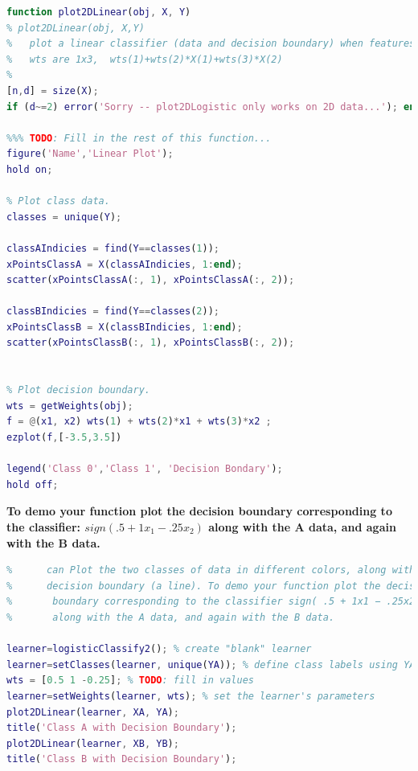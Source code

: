 \documentclass[]{report}   %
\begin{document}
\begin{lstlisting}[language=Matlab, caption=plot2DLinear() Implementation]
function plot2DLinear(obj, X, Y)
% plot2DLinear(obj, X,Y)
%   plot a linear classifier (data and decision boundary) when features X are 2-dim
%   wts are 1x3,  wts(1)+wts(2)*X(1)+wts(3)*X(2)
%
[n,d] = size(X);
if (d~=2) error('Sorry -- plot2DLogistic only works on 2D data...'); end;

%%% TODO: Fill in the rest of this function...
figure('Name','Linear Plot');
hold on;

% Plot class data.
classes = unique(Y);

classAIndicies = find(Y==classes(1));
xPointsClassA = X(classAIndicies, 1:end);
scatter(xPointsClassA(:, 1), xPointsClassA(:, 2));

classBIndicies = find(Y==classes(2));
xPointsClassB = X(classBIndicies, 1:end);
scatter(xPointsClassB(:, 1), xPointsClassB(:, 2));


% Plot decision boundary.
wts = getWeights(obj);
f = @(x1, x2) wts(1) + wts(2)*x1 + wts(3)*x2 ;
ezplot(f,[-3.5,3.5])

legend('Class 0','Class 1', 'Decision Bondary');
hold off;
\end{lstlisting}
{\bf To demo your function plot the decision boundary corresponding to the classifier: $sign( .5 + 1x_{1} − .25x_{2} )$ along with the A data, and again with the B data.}
\begin{lstlisting}[language=Matlab, caption=Demoing plot2DLinear()]
%% (B) Write the function @logisticClassify2/plot2DLinear.m such that it 
%      can Plot the two classes of data in different colors, along with the 
%      decision boundary (a line). To demo your function plot the decision 
%       boundary corresponding to the classifier sign( .5 + 1x1 − .25x2 )
%       along with the A data, and again with the B data.

learner=logisticClassify2(); % create "blank" learner
learner=setClasses(learner, unique(YA)); % define class labels using YA or YB
wts = [0.5 1 -0.25]; % TODO: fill in values
learner=setWeights(learner, wts); % set the learner's parameters
plot2DLinear(learner, XA, YA);
title('Class A with Decision Boundary');
plot2DLinear(learner, XB, YB);
title('Class B with Decision Boundary');
\end{lstlisting}
\end{document}

